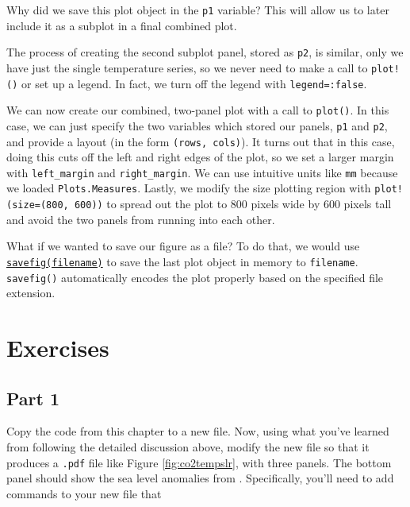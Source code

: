 \documentclass[
  11pt,
]{book}
\begin{document}
Why did we save this plot object in the \texttt{p1} variable? This will allow us to later include it as a subplot in a final combined plot.

The process of creating the second subplot panel, stored as \texttt{p2}, is similar, only we have just the single temperature series, so we never need to make a call to \texttt{plot!()} or set up a legend. In fact, we turn off the legend with \texttt{legend=:false}.

We can now create our combined, two-panel plot with a call to \texttt{plot()}. In this case, we can just specify the two variables which stored our panels, \texttt{p1} and \texttt{p2}, and provide a layout (in the form \texttt{(rows,\ cols)}). It turns out that in this case, doing this cuts off the left and right edges of the plot, so we set a larger margin with \texttt{left\_margin} and \texttt{right\_margin}. We can use intuitive units like \texttt{mm} because we loaded \texttt{Plots.Measures}. Lastly, we modify the size plotting region with \texttt{plot!(size=(800,\ 600))} to spread out the plot to 800 pixels wide by 600 pixels tall and avoid the two panels from running into each other.

What if we wanted to save our figure as a file? To do that, we would use \href{http://docs.juliaplots.org/latest/output/\#savefig-/-format}{\texttt{savefig(filename)}} to save the last plot object in memory to \texttt{filename}. \texttt{savefig()} automatically encodes the plot properly based on the specified file extension.

\hypertarget{exercises}{%
\section{Exercises}\label{exercises}}

\hypertarget{part-1}{%
\subsection*{Part 1}\label{part-1}}


Copy the code from this chapter to a new file. Now, using what you've learned from following the detailed discussion above, modify the new file so that it produces a \texttt{.pdf} file like Figure \ref{fig:co2tempslr}, with three panels. The bottom panel should show the sea level anomalies from \citet{Jevrejeva2014-my}. Specifically, you'll need to add commands to your new file that
\end{document}
